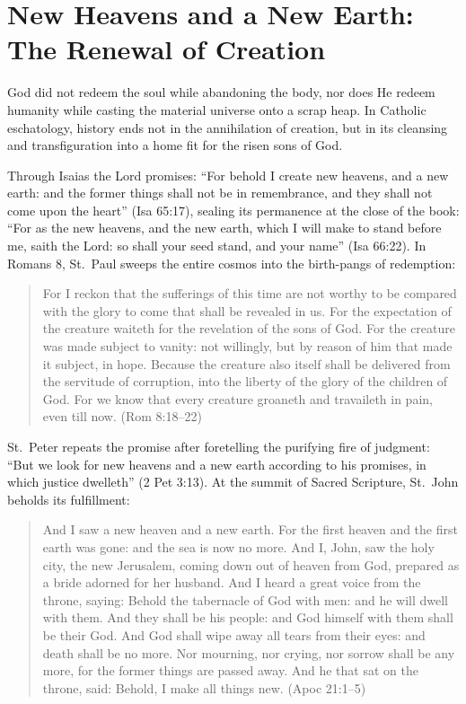 \section{New Heavens and a New Earth: The Renewal of Creation}

God did not redeem the soul while abandoning the body, nor does He redeem humanity while casting the material universe onto a scrap heap. In Catholic eschatology, history ends not in the annihilation of creation, but in its cleansing and transfiguration into a home fit for the risen sons of God.

Through Isaias the Lord promises: ``For behold I create new heavens, and a new earth: and the former things shall not be in remembrance, and they shall not come upon the heart'' (Isa 65:17), sealing its permanence at the close of the book: ``For as the new heavens, and the new earth, which I will make to stand before me, saith the Lord: so shall your seed stand, and your name'' (Isa 66:22). In Romans 8, St.\ Paul sweeps the entire cosmos into the birth-pangs of redemption:

\begin{quote}
For I reckon that the sufferings of this time are not worthy to be compared with the glory to come that shall be revealed in us. For the expectation of the creature waiteth for the revelation of the sons of God. For the creature was made subject to vanity: not willingly, but by reason of him that made it subject, in hope. Because the creature also itself shall be delivered from the servitude of corruption, into the liberty of the glory of the children of God. For we know that every creature groaneth and travaileth in pain, even till now. (Rom 8:18--22)
\end{quote}

St.\ Peter repeats the promise after foretelling the purifying fire of judgment: ``But we look for new heavens and a new earth according to his promises, in which justice dwelleth'' (2 Pet 3:13). At the summit of Sacred Scripture, St.\ John beholds its fulfillment:

\begin{quote}
And I saw a new heaven and a new earth. For the first heaven and the first earth was gone: and the sea is now no more. And I, John, saw the holy city, the new Jerusalem, coming down out of heaven from God, prepared as a bride adorned for her husband. And I heard a great voice from the throne, saying: Behold the tabernacle of God with men: and he will dwell with them. And they shall be his people: and God himself with them shall be their God. And God shall wipe away all tears from their eyes: and death shall be no more. Nor mourning, nor crying, nor sorrow shall be any more, for the former things are passed away. And he that sat on the throne, said: Behold, I make all things new. (Apoc 21:1--5)
\end{quote}

